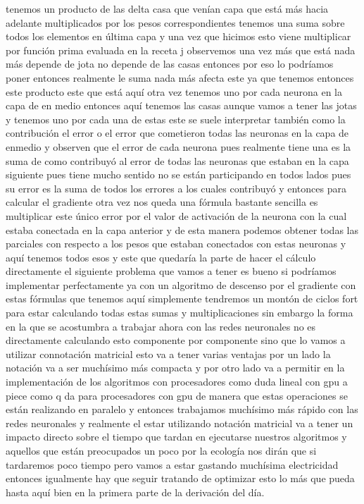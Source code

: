 tenemos un producto de las delta casa que venían capa que está más hacia adelante multiplicados por los pesos correspondientes tenemos una suma sobre todos los elementos en última capa y una vez que hicimos esto viene multiplicar por función prima evaluada en la receta j observemos una vez más que está nada más depende de jota no depende de las casas entonces por eso lo podríamos poner entonces realmente le suma nada más afecta este ya que tenemos entonces este producto este que está aquí otra vez tenemos uno por cada neurona en la capa de en medio entonces aquí tenemos las casas aunque vamos a tener las jotas y tenemos uno por cada una de estas este se suele interpretar también como la contribución el error o el error que cometieron todas las neuronas en la capa de enmedio y observen que el error de cada neurona pues realmente tiene una es la suma de como contribuyó al error de todas las neuronas que estaban en la capa siguiente pues tiene mucho sentido no se están participando en todos lados pues su error es la suma de todos los errores a los cuales contribuyó y entonces para calcular el gradiente otra vez nos queda una fórmula bastante sencilla es multiplicar este único error por el valor de activación de la neurona con la cual estaba conectada en la capa anterior y de esta manera podemos obtener todas las parciales con respecto a los pesos que estaban conectados con estas neuronas y aquí tenemos todos esos y este que quedaría la parte de hacer el cálculo directamente el siguiente problema que vamos a tener es bueno si podríamos implementar perfectamente ya con un algoritmo de descenso por el gradiente con estas fórmulas que tenemos aquí simplemente tendremos un montón de ciclos fort para estar calculando todas estas sumas y multiplicaciones sin embargo la forma en la que se acostumbra a trabajar ahora con las redes neuronales no es directamente calculando esto componente por componente sino que lo vamos a utilizar connotación matricial esto va a tener varias ventajas por un lado la notación va a ser muchísimo más compacta y por otro lado va a permitir en la implementación de los algoritmos con procesadores como duda lineal con gpu a piece como q da para procesadores con gpu de manera que estas operaciones se están realizando en paralelo y entonces trabajamos muchísimo más rápido con las redes neuronales y realmente el estar utilizando notación matricial va a tener un impacto directo sobre el tiempo que tardan en ejecutarse nuestros algoritmos y aquellos que están preocupados un poco por la ecología nos dirán que si tardaremos poco tiempo pero vamos a estar gastando muchísima electricidad entonces igualmente hay que seguir tratando de optimizar esto lo más que pueda hasta aquí bien en la primera parte de la derivación del día.
